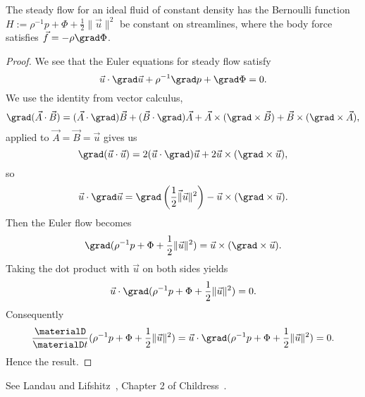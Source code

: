 \begin{node}[Hydrostatics]
\begin{node}
\begin{theorem}[Bernoulli]\label{fluids:euler-flow-000E}%
The steady flow for an ideal fluid of constant density has the Bernoulli
function $H:=\rho^{-1}p+\Phi+\frac{1}{2}\|\vec{u}\|^{2}$ be constant on
streamlines, where the body force satisfies $\vec{f}=-\rho\grad\Phi$.
\end{theorem}

\begin{proof}
We see that the Euler equations for steady flow satisfy
\begin{equation*}
\vec{u}\cdot\grad\vec{u}+\rho^{-1}\grad p+\grad\Phi=0.
\end{equation*}
We use the identity from vector calculus,
\begin{equation*}
\grad(\vec{A}\cdot\vec{B})=(\vec{A}\cdot\grad)\vec{B}+(\vec{B}\cdot\grad)\vec{A}+\vec{A}\times(\grad\times\vec{B})+\vec{B}\times(\grad\times\vec{A}),
\end{equation*}
applied to $\vec{A}=\vec{B}=\vec{u}$ gives us
\begin{equation*}
\grad(\vec{u}\cdot\vec{u})=2(\vec{u}\cdot\grad)\vec{u}+2\vec{u}\times(\grad\times\vec{u}),
\end{equation*}
so
\begin{equation*}
\vec{u}\cdot\grad\vec{u}=\grad\left(\frac{1}{2}\vec\|\vec{u}\|^{2}\right)-\vec{u}\times(\grad\times\vec{u}).
\end{equation*}
Then the Euler flow becomes
\begin{equation}
\grad(\rho^{-1}p+\Phi+\frac{1}{2}\|\vec{u}\|^{2})=\vec{u}\times(\grad\times\vec{u}).
\end{equation}
Taking the dot product with $\vec{u}$ on both sides yields
\begin{equation}
\vec{u}\cdot\grad(\rho^{-1}p+\Phi+\frac{1}{2}\|\vec{u}\|^{2})=0.
\end{equation}
Consequently
\begin{equation}
\frac{\materialD}{\materialD t}(\rho^{-1}p+\Phi+\frac{1}{2}\|\vec{u}\|^{2})
=\vec{u}\cdot\grad(\rho^{-1}p+\Phi+\frac{1}{2}\|\vec{u}\|^{2})
=0.
\end{equation}
Hence the result.
\end{proof}
\end{node} %

\begin{node}[References]\label{fluids:euler-flow-000A}%
See Landau and Lifshitz~\cite[\S3]{landau1987fluids}, Chapter 2 of
Childress~\cite{childress2009introduction}. 
\end{node} %
\end{node}

